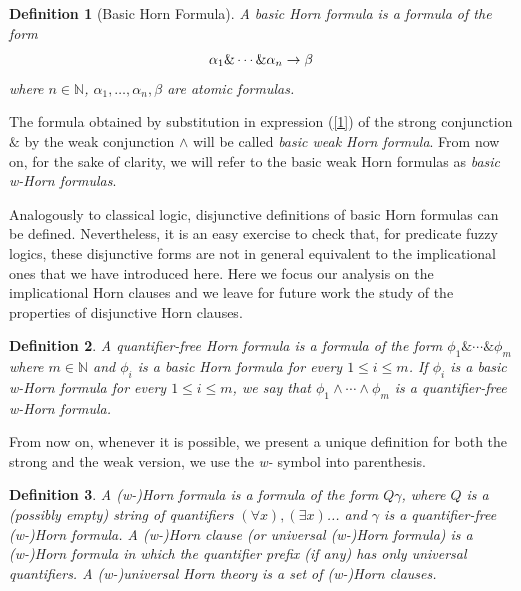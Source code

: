 \documentclass{IOS-Book-Article}
\newtheorem{defi}{Definition}
\begin{document}
\begin{defi}[Basic Horn Formula]\label{strong basic}A \emph{basic Horn formula} is a formula of the form \begin{equation} \label{1}
 \alpha_1\&\dotsb\&\alpha_n\rightarrow\beta \hfill 
\end{equation} 
where $n\in\mathbb{N}$, $\alpha_1,\ldots,\alpha_n, \beta$ are atomic formulas. 
\end{defi} 

The formula obtained by substitution in expression (\ref{1}) of the strong conjunction $\&$ by the weak conjunction $\wedge$  will be called \emph{basic weak Horn formula}. From now on, for the sake of clarity, we will refer to the basic weak Horn formulas as \emph{basic w-Horn formulas}. 

Analogously to classical logic, disjunctive definitions of basic Horn formulas can be defined. Nevertheless, it is an easy exercise to check that, for predicate fuzzy logics, these disjunctive forms are not in general equivalent to the implicational ones that we have introduced here. Here we focus our analysis on the implicational Horn clauses and we leave for future work the study of the properties of disjunctive Horn clauses.

\begin{defi}
\label{qf Horn} A \emph{quantifier-free Horn formula} is a formula of the form \newline $\phi_1\&\dotsb\&\phi_m$ where $m\in\mathbb{N}$ and $\phi_i$ is a basic Horn formula for every $1\leq i\leq m$. If $\phi_i$ is a basic w-Horn formula for every $1\leq i\leq m$, we say that $\phi_1\wedge\dotsb\wedge\phi_m$ is a \emph{quantifier-free w-Horn formula}.
\end{defi}
From now on, whenever it is possible, we present a unique definition for both the strong and the weak version, we use the \emph{w-} symbol into parenthesis.

\begin{defi}\label{Horn}A \emph{(w-)Horn formula} is a formula of the form $Q\gamma$, where $Q$ is a (possibly empty) string of quantifiers $(\forall x),(\exists x)$... and $\gamma$ is a quantifier-free (w-)Horn formula. A \emph{(w-)Horn clause} (or \emph{universal (w-)Horn formula}) is a (w-)Horn formula in which the quantifier prefix (if any) has only universal quantifiers. A \emph{(w-)universal Horn theory} is a set of (w-)Horn clauses. 
\end{defi}
\end{document}
